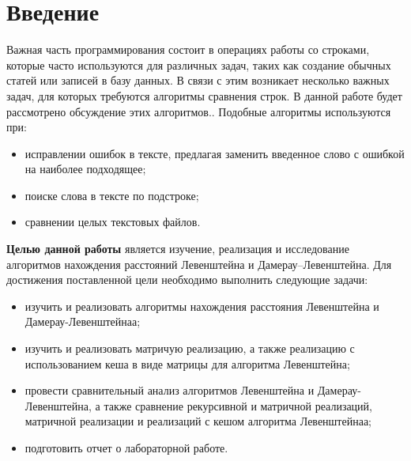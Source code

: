 \chapter*{Введение}


Важная часть программирования состоит в операциях работы со строками, которые часто используются для различных задач, таких как создание обычных статей или записей в базу данных. В связи с этим возникает несколько важных задач, для которых требуются алгоритмы сравнения строк. В данной работе будет рассмотрено обсуждение этих алгоритмов.. 
Подобные алгоритмы используются при:
\begin{itemize}
	\item исправлении ошибок в тексте, предлагая заменить введенное слово с ошибкой на наиболее подходящее;
    \item поиске слова в тексте по подстроке;
    \item сравнении целых текстовых файлов. \newline
\end{itemize}



\textbf{Целью данной работы} является изучение, реализация и исследование алгоритмов нахождения расстояний Левенштейна и Дамерау--Левенштейна. 
Для достижения поставленной цели необходимо выполнить следующие задачи:
\begin{itemize}
	\item изучить и реализовать алгоритмы нахождения расстояния Левенштейна и Дамерау-Левенштейнаа;
	\item изучить и реализовать матричую реализацию, а также реализацию с использованием кеша в виде матрицы для алгоритма Левенштейна;
    \item провести сравнительный анализ алгоритмов Левенштейна и Дамерау-Левенштейна, а также сравнение рекурсивной и матричной реализаций, матричной реализации и реализаций с кешом алгоритма Левенштейнаа;
    \item подготовить отчет о лабораторной работе.
\end{itemize}
